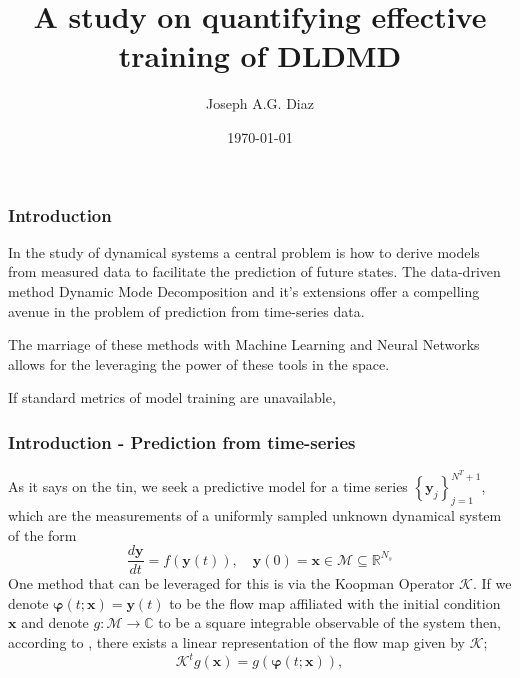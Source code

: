 \documentclass[11pt,aspectratio=169]{beamer}
\title{A study on quantifying effective training of DLDMD}
\author{Joseph A.G. Diaz}
\institute{Master of Science in Applied Mathematics\\ 
           with a Concentration in Dynamical Systems,\\
           San Diego State University}
\date{\today}
\newcommand{\parens}[1]{\left(#1\right)}
\newcommand{\bracks}[1]{\left\{#1\right\}}
\newcommand{\R}{\mathbb{R}}
\newcommand{\C}{\mathbb{C}}
\newcommand{\dd}[2]{\frac{d#1}{d#2}}
\begin{document}
    \frame{\titlepage}

    \begin{frame}
        \frametitle{Introduction}

        In the study of dynamical systems a central problem is how to derive models 
        from measured data to facilitate the prediction of future states. The data-driven
        method Dynamic Mode Decomposition and it's extensions offer a compelling avenue
        in the problem of prediction from time-series data.

        The marriage of these methods with Machine Learning and Neural Networks allows for
        the leveraging the power of these tools in the space. 

        If standard metrics of model training are unavailable, 
    
    \end{frame}

    \begin{frame}
        \frametitle{Introduction - Prediction from time-series}
        As it says on the tin, we seek a predictive model for a time series 
        $\bracks{\boldsymbol{y}_j}_{j=1}^{N^T+1}$, which are the measurements of a 
        uniformly sampled unknown dynamical system of the form
        \begin{equation}
            \dd{\boldsymbol{y}}{t} = f\parens{\boldsymbol{y}(t)},\quad \boldsymbol{y}(0) 
            = \boldsymbol{x} \in \mathcal{M} \subseteq \R^{N_s}
        \end{equation}
        One method that can be leveraged for this is via the Koopman Operator 
        $\mathcal{K}$. If we denote $\boldsymbol{\varphi}(t;\boldsymbol{x}) =
        \boldsymbol{y}(t)$ to be the flow map affiliated with the initial condition 
        $\boldsymbol{x}$ and denote $g: \mathcal{M} \to \C$ to be a square integrable 
        observable of the system then, according to \cite{koopman}, there exists a 
        linear representation of the flow map given by $\mathcal{K}$;
        \begin{equation}
            \mathcal{K}^t g(\boldsymbol{x}) = g(\boldsymbol{\varphi}(t; \boldsymbol{x})),
        \end{equation}
    
    \end{frame}
\end{document}
